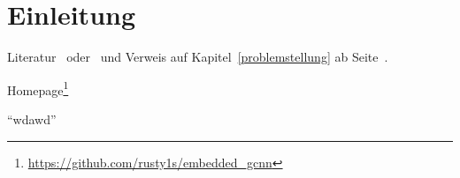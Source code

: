 \chapter{Einleitung}
\label{einleitung}

Literatur~\cite{Abramowski:1991} oder~\cite{Abramowski:1991, Muller:2011}
und Verweis auf Kapitel~\ref{problemstellung} ab Seite~\pageref{aufbau_der_arbeit}.

Homepage\footnote{\url{https://github.com/rusty1s/embedded\_gcnn}}

\enquote{wdawd}



